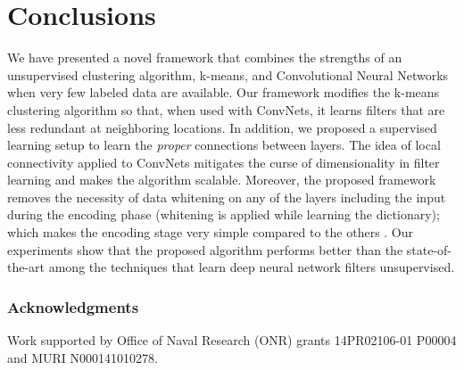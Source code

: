 \documentclass{article} \usepackage{iclr2016_workshop,times}
\begin{document}
\section{Conclusions}

We have presented a novel framework that combines the strengths of an unsupervised clustering algorithm, k-means, and Convolutional Neural Networks when very few labeled data are available.
Our framework modifies the k-means clustering algorithm so that, when used with ConvNets, it learns filters that are less redundant at neighboring locations.
In addition, we proposed a supervised learning setup to learn the \textit{proper} connections between layers.
The idea of local connectivity applied to ConvNets mitigates the curse of dimensionality in filter learning and makes the algorithm scalable.
Moreover, the proposed framework removes the necessity of data whitening on any of the layers including the input during the encoding phase (whitening is applied while learning the dictionary); which makes the encoding stage very simple compared to the others \citep{coates2011selecting,hui2013direct}.
Our experiments show that the proposed algorithm performs better than the state-of-the-art among the techniques that learn deep neural network filters unsupervised. 


\subsubsection*{Acknowledgments}
Work supported by Office of Naval Research (ONR) grants 14PR02106-01 P00004 and MURI N000141010278.



\end{document}

